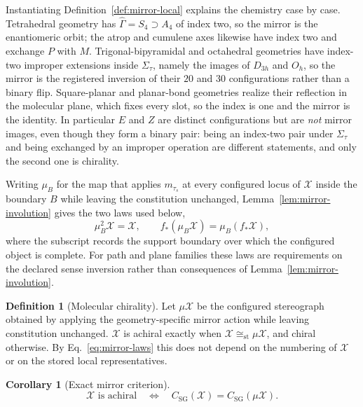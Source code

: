 \documentclass[pdflatex,sn-mathphys-num,referee,lineno]{sn-jnl}
\theoremstyle{plain}
\newtheorem{corollary}[theorem]{Corollary}
\theoremstyle{remark}
\theoremstyle{definition}
\newtheorem{definition}{Definition}
\begin{document}
Instantiating Definition~\ref{def:mirror-local} explains the chemistry
case by case.  Tetrahedral geometry has
\(\widehat\Gamma=S_4\supset A_4\) of index two, so the mirror is the
enantiomeric orbit; the atrop and cumulene axes likewise have index two and
exchange \(P\) with \(M\).  Trigonal-bipyramidal and octahedral geometries
have index-two improper extensions inside \(\Sigma_\tau\), namely the images of
\(D_{3h}\) and \(O_h\), so the mirror is the registered inversion of their
\(20\) and \(30\) configurations rather than a binary flip.  Square-planar and
planar-bond geometries realize their reflection in the molecular plane, which
fixes every slot, so the index is one and the mirror is the identity.  In
particular \(E\) and \(Z\) are distinct configurations but are \emph{not}
mirror images, even though they form a binary pair: being an index-two pair
under \(\Sigma_\tau\) and being exchanged by an improper operation are
different statements, and only the second one is chirality.

Writing \(\mu_B\) for the map that applies \(m_{\tau_s}\) at every configured
locus of \(\mathcal X\) inside the boundary \(B\) while leaving the
constitution unchanged, Lemma~\ref{lem:mirror-involution} gives the two laws
used below,
\begin{equation}
  \mu_B^2\mathcal X=\mathcal X,\qquad
  f_*(\mu_B\mathcal X)=\mu_B(f_*\mathcal X),
  \label{eq:mirror-laws}
\end{equation}
where the subscript records the support boundary over which the configured
object is complete.  For path and plane families these laws are requirements on
the declared sense inversion rather than consequences of
Lemma~\ref{lem:mirror-involution}.

\begin{definition}[Molecular chirality]
\label{def:molecular-chirality}
Let \(\mu\mathcal X\) be the configured stereograph obtained by applying the
geometry-specific mirror action while leaving constitution unchanged.
\(\mathcal X\) is achiral exactly when
\(\mathcal X\cong_{\mathrm{st}}\mu\mathcal X\), and chiral otherwise.  By
Eq.~\eqref{eq:mirror-laws} this does not depend on the numbering of
\(\mathcal X\) or on the stored local representatives.
\end{definition}

\begin{corollary}[Exact mirror criterion]
\label{cor:mirror}
\[
  \mathcal X\text{ is achiral}
  \quad\Longleftrightarrow\quad
  C_{\mathrm{SG}}(\mathcal X)
  =
  C_{\mathrm{SG}}(\mu\mathcal X).
\]
\end{corollary}
\end{document}
